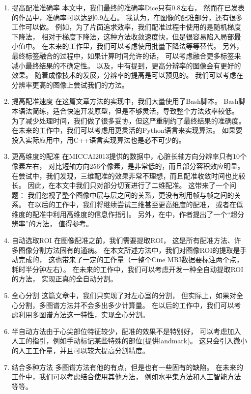 \begin{enumerate}
  \item{提高配准准确率}
    本文中，我们最终的准确率Dice只有0.8左右，
    然而在已发表的作品中，准确率可以达到0.9左右。
    我认为，在图像的配准部分，还有很多工作可以做。
    例如，为了片面追求效率，我们配准过程中使用的是随机梯度下降法，
    相对于梯度下降法，这种方法收敛速度快，但是很容易陷入局部最小值中。
    在未来的工作里，我们可以考虑使用批量下降法等等替代。
    另外，最终标签融合的过程中，如果计算时间允许的话，
    可以考虑融合更多标签来减小最终结果的不确定性。
    以及，\cite{HigherResolution}中有提到，更高分辨率的图像会有更好的效果。
    随着成像技术的发展，分辨率的提高是可以预见的。
    我们可以考虑在分辨率更高的图像上尝试我们的方法。
  \item{提高配准速度}
    在这篇文章方法的实现中，我们大量使用了Bash脚本。
    Bash脚本语法简练，适合快速开发原型，但是不够灵活，导致整个方法效率较低。
    为了减少处理时间，我们做了很多妥协，但这严重制约了最终结果的准确度。
    在未来的工作中，我们可以考虑用更灵活的Python语言来实现算法。
    如果要投入实际应用中，用C++语言实现算法也是必不可少的。
  \item{更高维度的配准}
    在MICCAI2013提供的数据中，心脏长轴方向分辨率只有10个像素左右，
    对比短轴方向256个像素，是非常低的，而且部分容积效应明显。
    在尝试中，我们发现，三维配准的效果非常不理想，而且配准收敛时间也比较长。
    因此，在本文中我们只对部分切面进行了二维配准。
    这带来了一个问题：
    我们忽视了整个图像中层与层之间的关系，更没有利用帧与帧之间的关系。
    在以后的工作中，我们将继续尝试三维甚至更高维度的配准，
    或者在低维度的配准中利用高维度的信息作指引。
    另外，在\cite{ShiSuperResolution2013}中，作者提出了一个``超分辨率''的方法，
    值得参考。
  \item{自动选取ROI}
    在图像配准之前，我们需要提取ROI，
    这是所有配准方法、许多图像分割方法固有的通病。
    在本文所述方法中，我们对图像ROI的提取是手动完成的，
    这也带来了一定的工作量（一整个Cine MRI数据要标注两个点，耗时半分钟左右）。
    在未来的工作中，我们可以考虑开发一种全自动提取ROI的方法，
    实现正真的全自动分割。
  \item{全心分割}
    这篇文章中，我们只实现了对左心室的分割，
    但实际上，如果对全心分割，多图谱方法并不会多出多少计算量。
    在以后的工作中，我们可以考虑利用多图谱方法这一特性，实现全心分割。
  \item{半自动方法}由于心尖部位特征较少，配准的效果不是特别好，
    可以考虑加入人工的指引，例如手动标记某些特殊的部位(提供landmark)。
    这只会引入微小的人工工作量，并且可以较大提高分割精度。
  \item{结合多种方法}
    多图谱方法有他的有点，但是也有一些固有的缺陷。
    在未来的工作中，我们可以考虑结合使用其他方法，
    例如水平集方法和人工智能方法等等。
\end{enumerate}
